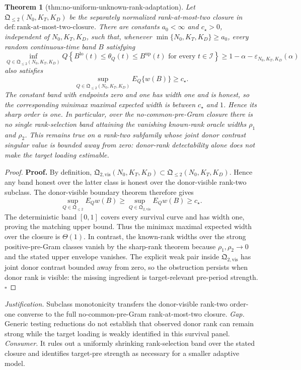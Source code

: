 \documentclass{article}
\newtheorem{theorem}{Theorem}
\begin{document}
\begin{theorem}[thm:no-uniform-unknown-rank-adaptation]\label{thm:no-uniform-unknown-rank-adaptation}
Let \(\mathfrak Q_{\leq2}(N_0,K_T,K_D)\) be the separately normalized
rank-at-most-two closure in
\(\mathrm{def:rank\mbox{-}at\mbox{-}most\mbox{-}two\mbox{-}closure}\).  There are
constants \(a_0<\infty\) and \(c_\star>0\), independent of
\(N_0,K_T,K_D\), such that, whenever
\(\min\{N_0,K_T,K_D\}\geq a_0\), every random continuous-time band \(B\)
satisfying
\[
\inf_{Q\in\mathfrak Q_{\leq2}(N_0,K_T,K_D)}
Q\left\{B^{\mathrm{lo}}(t)\leq\theta_Q(t)\leq B^{\mathrm{up}}(t)
\text{ for every }t\in\mathcal I\right\}
\geq1-\alpha-\varepsilon_{N_0,K_T,K_D}(\alpha)
\]
also satisfies
\[
\sup_{Q\in\mathfrak Q_{\leq2}(N_0,K_T,K_D)}E_Q\{w(B)\}\geq c_\star.
\]
The constant band with endpoints zero and one has width one and is honest, so the
corresponding minimax maximal expected width is between \(c_\star\) and \(1\).
Hence its sharp order is one.  In particular, over the no-common-pre-Gram closure
there is no single rank-selection band attaining the vanishing known-rank oracle
widths \(\rho_1\) and \(\rho_2\).  This remains true on a rank-two subfamily whose
joint donor contrast singular value is bounded away from zero: donor-rank
detectability alone does not make the target loading estimable.
\end{theorem}
\begin{proof}
\textbf{Proof.}
By definition,
\(\mathfrak Q_{2,\mathrm{vis}}(N_0,K_T,K_D)\subset
\mathfrak Q_{\le2}(N_0,K_T,K_D)\).  Hence any band honest over the latter class is honest over the donor-visible rank-two subclass.  The donor-visible boundary theorem therefore gives
\[
 \sup_{Q\in\mathfrak Q_{\le2}}E_Qw(B)
 \ge\sup_{Q\in\mathfrak Q_{2,\mathrm{vis}}}E_Qw(B)
 \ge c_\star.                                           \tag{1}
\]
The deterministic band \([0,1]\) covers every survival curve and has width one, proving the matching upper bound.  Thus the minimax maximal expected width over the closure is \(\Theta(1)\).  In contrast, the known-rank widths over the strong positive-pre-Gram classes vanish by the sharp-rank theorem because \(\rho_1,\rho_2\to0\) and the stated upper envelope vanishes.  The explicit weak pair inside \(\mathfrak Q_{2,\mathrm{vis}}\) has joint donor contrast bounded away from zero, so the obstruction persists when donor rank is visible: the missing ingredient is target-relevant pre-period strength. \(\square\)
\end{proof}
\par\smallskip\noindent \textit{Justification.} Subclass monotonicity transfers the donor-visible rank-two order-one converse to the full no-common-pre-Gram rank-at-most-two closure. \textit{Gap.} Generic testing reductions do not establish that observed donor rank can remain strong while the target loading is weakly identified in this survival panel. \textit{Consumer.} It rules out a uniformly shrinking rank-selection band over the stated closure and identifies target-pre strength as necessary for a smaller adaptive model.
\end{document}
